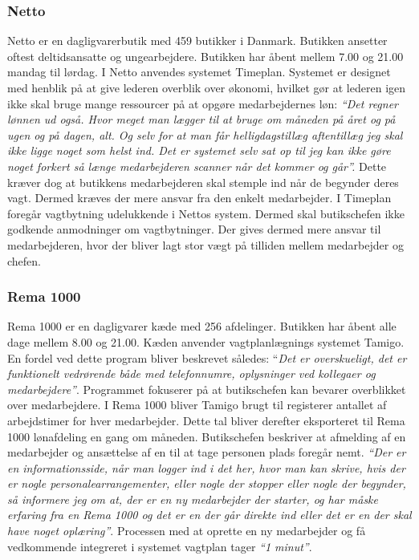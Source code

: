 \subsubsection{Netto}
Netto er en dagligvarerbutik med 459 butikker i Danmark. Butikken ansetter oftest deltidsansatte og ungearbejdere. Butikken har åbent mellem 7.00 og 21.00 mandag til lørdag. I Netto anvendes systemet Timeplan. Systemet er designet med henblik på at give lederen overblik over økonomi, hvilket gør at lederen igen ikke skal bruge mange ressourcer på at opgøre medarbejdernes løn:\textit{ “Det regner lønnen ud også. Hvor meget man lægger til at bruge om måneden på året og på ugen og på dagen, alt. Og selv for at man får helligdagstillæg aftentillæg jeg skal ikke ligge noget som helst ind. Det er systemet selv sat op til jeg kan ikke gøre noget forkert så længe medarbejderen scanner når det kommer og går”.} Dette kræver dog at butikkens medarbejderen skal stemple ind når de begynder deres vagt. Dermed kræves der mere ansvar fra den enkelt medarbejder. I Timeplan foregår vagtbytning udelukkende i Nettos system. Dermed skal butikschefen ikke godkende anmodninger om vagtbytninger. Der gives dermed mere ansvar til medarbejderen, hvor der bliver lagt stor vægt på tilliden mellem medarbejder og chefen.

\subsubsection{Rema 1000}
Rema 1000 er en dagligvarer kæde med 256 afdelinger. Butikken har åbent alle dage mellem 8.00 og 21.00. Kæden anvender vagtplanlægnings systemet  Tamigo. En fordel ved dette program bliver beskrevet således: “\textit{Det er overskueligt, det er funktionelt vedrørende både med telefonnumre, oplysninger ved kollegaer og medarbejdere”}. Programmet fokuserer på at butikschefen kan bevarer overblikket over medarbejdere. I Rema 1000 bliver Tamigo brugt til registerer antallet af arbejdstimer for hver medarbejder. Dette tal bliver derefter eksporteret til Rema 1000 lønafdeling en gang om måneden. Butikschefen beskriver at afmelding af en medarbejder og ansættelse af en til at tage personen plads foregår nemt.
\textit{“Der er en informationsside, når man logger ind i det her, hvor man kan skrive, hvis der er nogle personalearrangementer, eller nogle der stopper eller nogle der begynder, så informere jeg om at, der er en ny medarbejder der starter, og har måske erfaring fra en Rema 1000 og det er en der går direkte ind eller det er en der skal have noget oplæring”}. Processen med at oprette en ny medarbejder og få vedkommende integreret i systemet vagtplan tager \textit{“1 minut”}.


